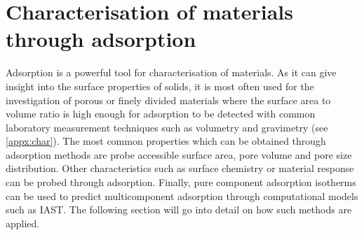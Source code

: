 
\section{Characterisation of materials through adsorption}

Adsorption is a powerful tool for characterisation of materials.
As it can give insight into the surface properties of solids, it
is most often used for the investigation of porous or finely
divided materials where the surface area to volume ratio is 
high enough for adsorption to be detected with common laboratory 
measurement techniques such as volumetry and gravimetry (see 
\autoref{appx:char}). The most common properties which can
be obtained through adsorption methods are probe accessible 
surface area, pore volume and pore size distribution. Other 
characteristics such as surface chemistry or material response
can be probed through adsorption. Finally, pure component adsorption
isotherms can be used to predict multicomponent adsorption through
computational models such as IAST. The following section will go into
detail on how such methods are applied. 



